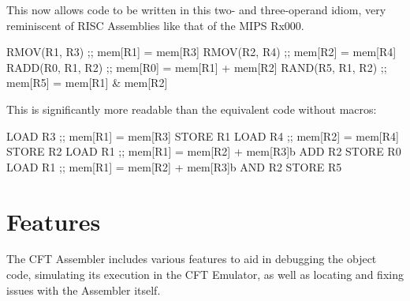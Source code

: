 This now allows code to be written in this two- and three-operand idiom, very
reminiscent of RISC Assemblies like that of the MIPS Rx000.

\begin{cftasmcode}
        RMOV(R1, R3)            ;; mem[R1] = mem[R3]
        RMOV(R2, R4)            ;; mem[R2] = mem[R4]
        RADD(R0, R1, R2)        ;; mem[R0] = mem[R1] + mem[R2]
        RAND(R5, R1, R2)        ;; mem[R5] = mem[R1] & mem[R2]
\end{cftasmcode}

This is significantly more readable than the equivalent code without macros:

\begin{cftasmcode}
        LOAD R3                 ;; mem[R1] = mem[R3]
        STORE R1
        LOAD R4                 ;; mem[R2] = mem[R4]
        STORE R2
        LOAD R1                 ;; mem[R1] = mem[R2] + mem[R3]b
        ADD R2
        STORE R0
        LOAD R1                 ;; mem[R1] = mem[R2] + mem[R3]b
        AND R2
        STORE R5
\end{cftasmcode}


\section{Features}

The CFT Assembler includes various features to aid in debugging the object
code, simulating its execution in the CFT Emulator, as well as locating and
fixing issues with the Assembler itself.

















